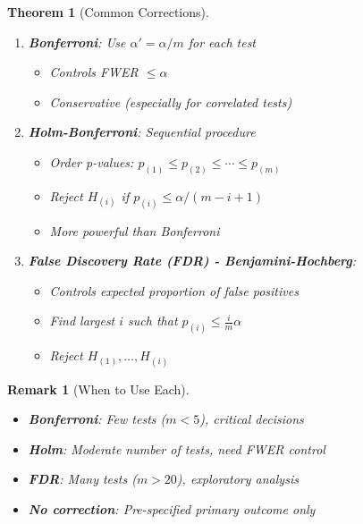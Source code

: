 \documentclass{article}
\newtheorem{theorem}{Theorem}
\newtheorem{remark}{Remark}
\begin{document}
\begin{theorem}[Common Corrections]
\begin{enumerate}
    \item \textbf{Bonferroni}: Use $\alpha' = \alpha/m$ for each test
    \begin{itemize}
        \item Controls FWER $\leq \alpha$
        \item Conservative (especially for correlated tests)
    \end{itemize}
    
    \item \textbf{Holm-Bonferroni}: Sequential procedure
    \begin{itemize}
        \item Order p-values: $p_{(1)} \leq p_{(2)} \leq \cdots \leq p_{(m)}$
        \item Reject $H_{(i)}$ if $p_{(i)} \leq \alpha/(m-i+1)$
        \item More powerful than Bonferroni
    \end{itemize}
    
    \item \textbf{False Discovery Rate (FDR) - Benjamini-Hochberg}:
    \begin{itemize}
        \item Controls expected proportion of false positives
        \item Find largest $i$ such that $p_{(i)} \leq \frac{i}{m}\alpha$
        \item Reject $H_{(1)}, \ldots, H_{(i)}$
    \end{itemize}
\end{enumerate}
\end{theorem}

\begin{remark}[When to Use Each]
\begin{itemize}
    \item \textbf{Bonferroni}: Few tests ($m < 5$), critical decisions
    \item \textbf{Holm}: Moderate number of tests, need FWER control
    \item \textbf{FDR}: Many tests ($m > 20$), exploratory analysis
    \item \textbf{No correction}: Pre-specified primary outcome only
\end{itemize}
\end{remark}
\end{document}
